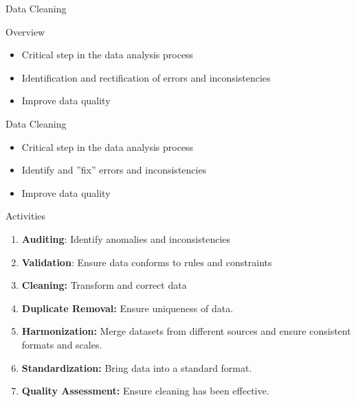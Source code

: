 \documentclass[ignorenonframetext,xcolor=x11names]{beamer}
\begin{document}
\begin{frame}{Data Cleaning}

\begin{block}{Overview}
\begin{itemize}
  \item Critical step in the data analysis process
  \item Identification and rectification of errors and inconsistencies
  \item Improve data quality
\end{itemize}
\end{block}
\end{frame}

\begin{frame}{Data Cleaning}
\begin{itemize}
  \item Critical step in the data analysis process
  \item Identify and ''fix'' errors and inconsistencies
  \item Improve data quality
\end{itemize}

\begin{block}{Activities}
\begin{enumerate}
    \item \textbf{Auditing}: Identify anomalies and inconsistencies

    \item \textbf{Validation}: Ensure data conforms to rules and constraints

    \item \textbf{Cleaning:} Transform and correct data

    \item \textbf{Duplicate Removal:} Ensure uniqueness of data.

    \item \textbf{Harmonization:} Merge datasets from different sources and ensure consistent formats and scales.

    \item \textbf{Standardization:} Bring data into a standard format.

    \item \textbf{Quality Assessment:} Ensure cleaning has been effective.
\end{enumerate}
\end{block}
\end{frame}
\end{document}
